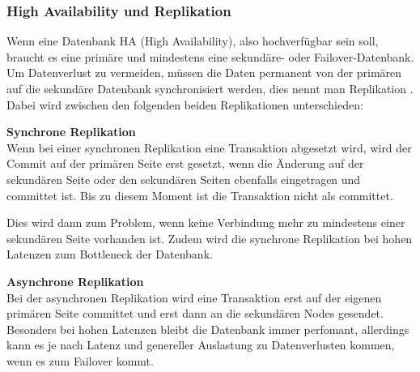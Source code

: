 
\subsubsection{High Availability und Replikation}
\begin{flushleft}
    Wenn eine Datenbank HA (High Availability), also hochverfügbar sein soll, braucht es eine primäre und mindestens eine sekundäre- oder \Gls{Failover}-Datenbank.
    Um Datenverlust zu vermeiden, müssen die Daten permanent von der primären auf die sekundäre Datenbank synchronisiert werden, dies nennt man Replikation \cite{D9RDXENY}.
    Dabei wird zwischen den folgenden beiden Replikationen unterschieden:
\end{flushleft}
\begin{flushleft}
    \textbf{Synchrone Replikation}\\
    Wenn bei einer synchronen Replikation eine Transaktion abgesetzt wird, wird der Commit auf der primären Seite erst gesetzt, wenn die Änderung auf der sekundären Seite oder den sekundären Seiten ebenfalls eingetragen und committet ist.
    Bis zu diesem Moment ist die Transaktion nicht als committet.
    
    Dies wird dann zum Problem, wenn keine Verbindung mehr zu mindestens einer sekundären Seite vorhanden ist.
    Zudem wird die synchrone Replikation bei hohen Latenzen zum Bottleneck der Datenbank.
\end{flushleft}
\begin{flushleft}
    \textbf{Asynchrone Replikation}\\
    Bei der asynchronen Replikation wird eine Transaktion erst auf der eigenen primären Seite committet und erst dann an die sekundären Nodes gesendet.
    Besonders bei hohen Latenzen bleibt die Datenbank immer perfomant, allerdings kann es je nach Latenz und genereller Auslastung zu Datenverlusten kommen, wenn es zum \Gls{Failover} kommt.
\end{flushleft}